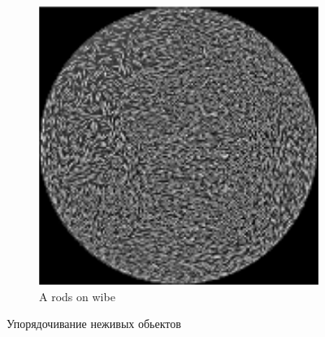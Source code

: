 \begin{figure}
\begin{subfigure}{.4\columnwidth}
                \includegraphics[width=\columnwidth]{Fig6_CollectiveMotion}
                \caption{A rods on wibe}
                \label{fig:CollMot:rods}
        \end{subfigure}
        \caption{Упорядочивание неживых обьектов}
        \label{fig:CollMot:NonLiving}
    \end{figure}
        ~ %
